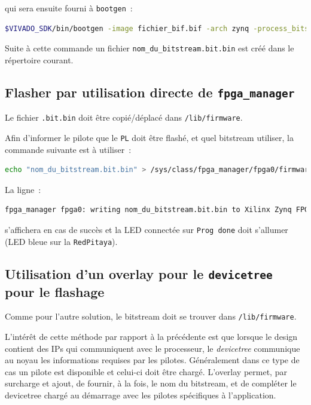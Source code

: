 \documentclass[12pt,oneside]{article}
\begin{document}
qui sera ensuite fourni \`a {\tt bootgen}~:
\begin{lstlisting}[language=bash]
$VIVADO_SDK/bin/bootgen -image fichier_bif.bif -arch zynq -process_bitstream bin
\end{lstlisting}

Suite \`a cette commande un fichier {\tt nom\_du\_bitstream.bit.bin} est cr\'e\'e
dans le r\'epertoire courant.

\subsection{Flasher par utilisation directe de {\tt fpga\_manager}}

Le fichier {\tt .bit.bin} doit \^etre copi\'e/d\'eplac\'e dans {\tt /lib/firmware}.

Afin d'informer le pilote que le {\tt PL} doit \^etre flash\'e, et quel
bitstream utiliser, la commande suivante est \`a utiliser~:
\begin{lstlisting}[language=bash]
echo "nom_du_bitstream.bit.bin" > /sys/class/fpga_manager/fpga0/firmware
\end{lstlisting}
La ligne~:
\begin{lstlisting}[language=bash]
fpga_manager fpga0: writing nom_du_bitstream.bit.bin to Xilinx Zynq FPGA Manager
\end{lstlisting}
s'affichera en cas de succ\`es et la LED connect\'ee sur {\tt Prog done} doit
s'allumer (LED bleue sur la {\tt RedPitaya}).

\subsection{Utilisation d'un overlay pour le {\tt devicetree} pour le flashage}

Comme pour l'autre solution, le bitstream doit se trouver dans
{\tt /lib/firmware}.

L'int\'er\^et de cette m\'ethode par rapport \`a la pr\'ec\'edente est que lorsque
le design contient des IPs qui communiquent avec le processeur, le {\em devicetree}
communique au noyau les informations requises par les pilotes.
G\'en\'eralement dans ce type de cas un pilote est disponible et celui-ci doit
\^etre charg\'e. L'overlay permet, par surcharge et ajout, de fournir, \`a la
fois, le nom du
bitstream, et de compl\'eter le devicetree charg\'e au d\'emarrage
avec les pilotes sp\'ecifiques \`a l'application.
\end{document}
